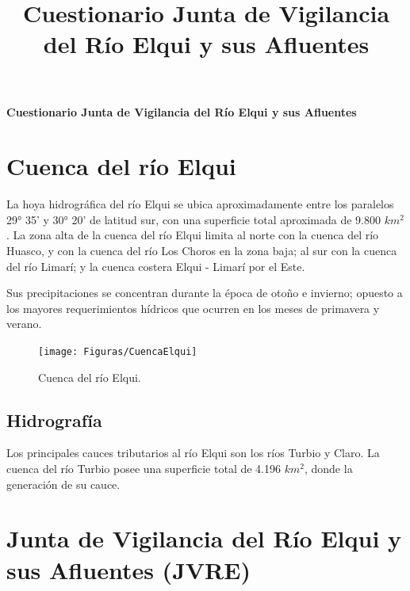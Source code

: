 \documentclass[10pt,]{article}
\title{Cuestionario Junta de Vigilancia del Río Elqui y sus Afluentes}
\date{ }                                           %
\begin{document}
	\begin{large}
	\begin{center}
		\textbf{Cuestionario Junta de Vigilancia del Río Elqui y sus Afluentes}\bigskip
	\end{center}
	\end{large}
	
	
\begin{enumerate}


\end{enumerate}

\newpage

\section{Cuenca del río Elqui}\bigskip

La hoya hidrográfica del río Elqui se ubica aproximadamente entre los paralelos 29° 35' y 30° 20' de latitud sur, con una superficie total aproximada de 9.800 $km^2$. La zona alta de la cuenca  del río Elqui limita al norte con la cuenca del río Huasco, y con la cuenca del río Los Choros en la zona baja; al sur con la cuenca del río Limarí; y la cuenca costera Elqui - Limarí por el Este.\bigskip

Sus precipitaciones se concentran durante la época de otoño e invierno; opuesto a los mayores requerimientos hídricos que ocurren en los meses de primavera y verano.



\begin{figure}[!h]
\begin{center}
\texttt{[image: Figuras/CuencaElqui]}
\caption{Cuenca del río Elqui.}
\label{etiqueta_figura1}
\end{center}
\end{figure}

		\subsection{Hidrografía}\bigskip
		
		Los principales cauces tributarios al río Elqui son los ríos Turbio y Claro. La cuenca del río Turbio posee una superficie total de 4.196 $km^2$, donde la generación de su cauce.
		
\section{Junta de Vigilancia del Río Elqui y sus Afluentes (JVRE)}\bigskip
\end{document}
